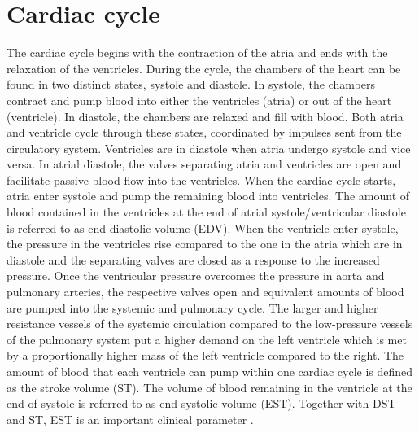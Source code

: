 \section{Cardiac cycle}
The cardiac cycle begins with the contraction of the atria and ends with the relaxation of the ventricles. During the cycle, the chambers of the heart can be found in two distinct states, systole and diastole. In systole, the chambers contract and pump blood into either the ventricles (atria) or out of the heart (ventricle). In diastole, the chambers are relaxed and fill with blood. Both atria and ventricle cycle through these states, coordinated by impulses sent from the circulatory system.  Ventricles are in diastole when atria undergo systole and vice versa. In atrial diastole, the valves separating atria and ventricles are open and facilitate passive blood flow into the ventricles. When the cardiac cycle starts, atria enter systole and pump the remaining blood into ventricles.  The amount of blood contained in the ventricles at the end of atrial systole/ventricular diastole is referred to as end diastolic volume (EDV). When the ventricle enter systole, the pressure in the ventricles rise compared to the one in the atria which are in diastole and the separating valves are closed as a response to the increased pressure. Once the ventricular pressure overcomes the pressure in aorta and pulmonary arteries, the respective valves open and equivalent amounts of blood are pumped into the systemic and pulmonary cycle. The larger and higher resistance vessels of the systemic circulation compared to the low-pressure vessels of the pulmonary system put a higher demand on the left ventricle which is met by a proportionally higher mass of the left ventricle compared to the right. The amount of blood that each ventricle can pump within one cardiac cycle is defined as the stroke volume (ST). The volume of blood remaining in the ventricle at the end of systole is referred to as end systolic volume (EST). Together with DST and ST, EST is an important clinical parameter \citep{Betts2013}. 

